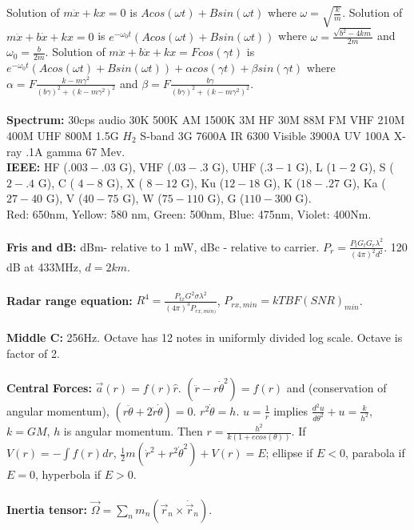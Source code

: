 Solution of $m\ddot{x} +kx=0$ 
is $Acos(\omega t)+Bsin(\omega t)$ where $\omega= {\sqrt {\frac k m}}$.
Solution of $m\ddot{x} +b \dot{x} +kx=0$
is $e^{- \omega_0 t} (Acos(\omega t)+Bsin(\omega t))$ where 
$\omega= {\frac {\sqrt {b^2-4 k m}} {2m}}$ and
$\omega_0= {\frac b {2m}}$.
Solution of $m\ddot{x} +b \dot{x} +kx= F cos(\gamma t)$ is
$e^{- \omega_0 t} (Acos(\omega t)+Bsin(\omega t)) +
\alpha cos(\gamma t)+ \beta sin (\gamma t)$ where 
$\alpha= F{\frac {k- m \gamma^2} {(b \gamma)^2 + (k - m \gamma^2)^2}}$ and
$\beta= F{\frac {b \gamma} {(b \gamma)^2 + (k - m \gamma^2)^2}}$.
\\
\\
{\bf Spectrum:}  
30cps audio 30K 500K AM 1500K 3M HF 30M 88M FM VHF 210M 400M UHF 800M 1.5G 
$H_{2}$ S-band 3G 7600A IR 6300 Visible 3900A UV 100A X-ray .1A gamma
67 Mev. 
\\
{\bf IEEE:} HF ($.003 - .03$ G), VHF ($.03 - .3$ G), UHF ($.3 - 1$ G), L ($1 - 2$ G),
S ($2 - .4$ G), C ( $4 - 8$ G), X ( $8 - 12$ G),
Ku ($12 - 18$ G), K ($18 - .27$ G), Ka ($27  - 40$ G),
V ($40 - 75$ G), W ($75 - 110$ G), G ($110 - 300$ G).
\\
Red: 650nm, Yellow: 580 nm, Green: 500nm, Blue: 475nm, Violet: 400Nm.  
\\
\\
{\bf Fris and dB:} dBm- relative to 1 mW, dBc - relative to carrier.
$P_r = {\frac { P_t G_t G_r \lambda^2} { (4 \pi)^2 d^2}}$. 120 dB at 433MHz,
$d= 2km$.
\\
\\
{\bf Radar range equation:} $R^4= {\frac {P_{tx} G^2 \sigma \lambda^2}
{(4 \pi)^3 P_{rx, min)}} }$, $P_{rx, min} = k T B F (SNR)_{min}$.
\\
\\
{\bf Middle C:}  256Hz. Octave has 12 notes in uniformly divided log scale.
Octave is factor of 2.
\\
\\
{\bf Central Forces:} $\vec{a}(r)=f(r) \hat{r}$.  
$(\ddot{r}-r{\dot{\theta}}^2)=f(r)$ and (conservation of angular momentum),
$(r \ddot{\theta} + 2 \dot{r} \dot{\theta})=0$. $r^2 \dot{\theta}=h$.
$u= {\frac {1} {r}}$ implies ${\frac {d^2 u}{d \theta^2}} + u = {\frac k {h^2}}$,
$k= GM$, $h$ is angular momentum.  
Then $r= {\frac {h^2}{k(1+e cos( \theta ))}}$.  If 
$V(r)= - \int f(r) dr$, ${\frac 1 2} m({\dot {r}}^2 +r^2 {\dot{\theta}}^2)+V(r)= E$;
ellipse if $E<0$, parabola if $E=0$, hyperbola if $E>0$.
\\
\\
{\bf Inertia tensor:} ${\vec \Omega} = \sum_n m_n ({\vec r_n} \times \dot{\vec r}_n)$.
